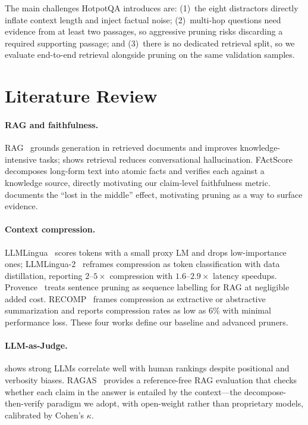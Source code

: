 \documentclass[runningheads]{llncs}
\begin{document}
The main challenges HotpotQA introduces are: (1)~the eight distractors directly
inflate context length and inject factual noise; (2)~multi-hop questions need
evidence from at least two passages, so aggressive pruning risks discarding a
required supporting passage; and (3)~there is no dedicated retrieval split, so
we evaluate end-to-end retrieval alongside pruning on the same validation
samples.

\section{Literature Review}

\paragraph{RAG and faithfulness.}
RAG~\cite{lewis2020rag} grounds generation in retrieved documents and improves
knowledge-intensive tasks; \cite{shuster2021retrieval} shows retrieval reduces
conversational hallucination. FActScore~\cite{min2023factscore} decomposes
long-form text into atomic facts and verifies each against a knowledge source,
directly motivating our claim-level faithfulness metric.
\cite{liu2024lost} documents the ``lost in the middle'' effect, motivating
pruning as a way to surface evidence.

\paragraph{Context compression.}
LLMLingua~\cite{jiang2023llmlingua} scores tokens with a small proxy LM and
drops low-importance ones; LLMLingua-2~\cite{pan2024llmlingua2} reframes
compression as token classification with data distillation, reporting
$2$--$5\times$ compression with $1.6$--$2.9\times$ latency speedups.
Provence~\cite{yoon2024provence} treats sentence pruning as sequence labelling
for RAG at negligible added cost. RECOMP~\cite{xu2023recomp} frames compression
as extractive or abstractive summarization and reports compression rates as low
as 6\% with minimal performance loss. These four works define our baseline and
advanced pruners.

\paragraph{LLM-as-Judge.}
\cite{zheng2023mtbench} shows strong LLMs correlate well with human rankings
despite positional and verbosity biases. RAGAS~\cite{es2023ragas} provides a
reference-free RAG evaluation that checks whether each claim in the answer is
entailed by the context---the decompose-then-verify paradigm we adopt, with
open-weight rather than proprietary models, calibrated by Cohen's $\kappa$.
\end{document}
